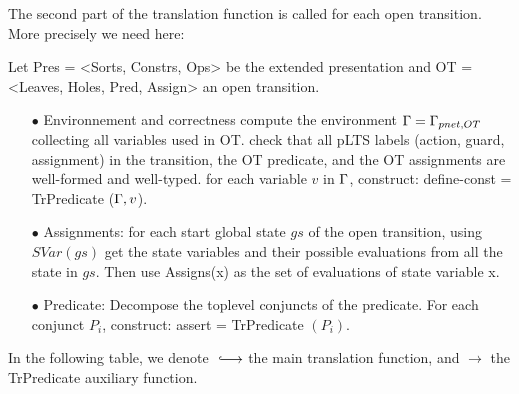 \documentclass{lncs/llncs}
\newcommand{\TODO}[1]{\textcolor{red}{\textbf{[TODO:#1]}}}
\begin{document}
The second part of the translation function is called for each open
transition. More precisely we need here:

Let Pres = <Sorts, Constrs, Ops> be the extended presentation
and OT = <Leaves, Holes, Pred, Assign> an open transition.
\begin{itemize}
\item[$\bullet$] Environnement and correctness
  \subitem compute the environment $\Gamma=\Gamma_{pnet,OT}$ collecting
all variables used in OT.
\subitem check that all pLTS labels (action, guard, assignment) in
the transition, the OT predicate, and the OT assignments are
well-formed and well-typed.
\subitem for each variable $v$ in $\Gamma$, construct:
  define-const = TrPredicate ($\Gamma ,v$).
\item[$\bullet$] Assignments: for each start global state $gs$ of the open transition, using $SVar(gs)$
  get the state variables and their possible evaluations from all the state in $gs$.
  Then use Assigns(x) as the set of evaluations of state variable x.
\item[$\bullet$] Predicate: Decompose the toplevel conjuncts of the predicate. For each conjunct $P_i$, construct:
  assert = TrPredicate $(P_i)$.
\end{itemize}

\smallskip
In the following table, we denote $\translate$ the main translation
function, and $\longrightarrow$ the TrPredicate auxiliary function.
\end{document}
